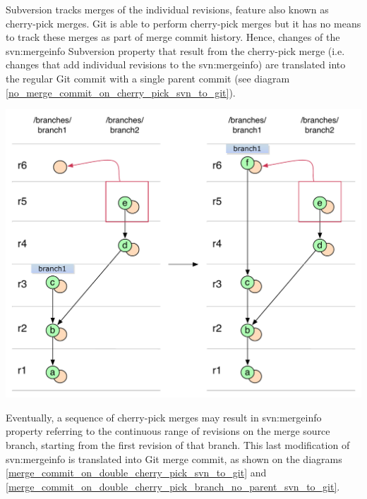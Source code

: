 Subversion tracks merges of the individual revisions, feature also known as cherry-pick merges. 
Git is able to perform cherry-pick merges but it has no means to track these merges as part of merge commit history. 
Hence, changes of the svn:mergeinfo Subversion property that result from the cherry-pick merge (i.e. changes that add individual revisions to the svn:mergeinfo) are
translated into the regular Git commit with a single parent commit (see diagram \ref{no_merge_commit_on_cherry_pick_svn_to_git}).
\begin{center}
\includegraphics[width=\textwidth]{img/diagrams/no_merge_commit_on_cherry_pick_svn_to_git.pdf}%
\label{no_merge_commit_on_cherry_pick_svn_to_git}%
\end{center}

Eventually, a sequence of cherry-pick merges may result in svn:mergeinfo property referring to the 
continuous range of revisions on the merge source branch, starting from the first revision 
of that branch. This last modification of svn:mergeinfo is translated into Git merge commit, as 
shown on the diagrams \ref{merge_commit_on_double_cherry_pick_svn_to_git} and \ref{merge_commit_on_double_cherry_pick_branch_no_parent_svn_to_git}.

